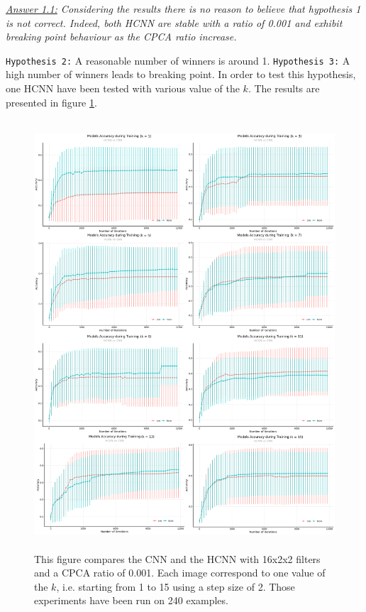 \documentclass[11pt]{report}
\begin{document}
\noindent \textit{\underline{Answer 1.1:} Considering the results there is no reason to believe that hypothesis 1 is not correct. Indeed, both HCNN are stable with a ratio of 0.001 and exhibit breaking point behaviour as the CPCA ratio increase.}
\newpage

\noindent \texttt{Hypothesis 2:} A reasonable number of winners is around 1.
\newline
\noindent \texttt{Hypothesis 3:} A high number of winners leads to breaking point.
\newline
\newline
\noindent In order to test this hypothesis, one HCNN have been tested with various value of the $k$. The results are presented in figure \ref{fig:hcnn_breaking_point_kwta}.

\begin{figure}[h]
\centering
\includegraphics[width=14.5cm, height=16cm]{longRun-f_16-ds_250-kwta}
\caption[Experiment 2: What are the causes of the breaking point?]{This figure compares the CNN and the HCNN with 16x2x2 filters and a CPCA ratio of 0.001. Each image correspond to one value of the $k$, i.e. starting from 1 to 15 using a step size of 2. Those experiments have been run on 240 examples.}
\label{fig:hcnn_breaking_point_kwta}
\end{figure}
\end{document}
